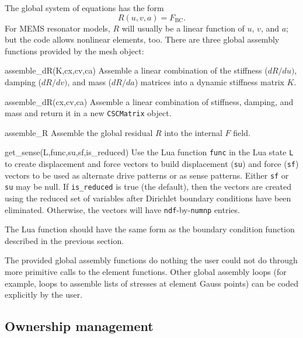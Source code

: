 \documentclass{article}
\newenvironment{codelist}[1][\quad]%
  {\begin{list}{}{%
   \settowidth{\labelwidth}{\texttt{#1}\hfil}%
   \setlength{\leftmargin}{\labelwidth}%
   \addtolength{\leftmargin}{\labelsep}%
   \addtolength{\leftmargin}{\parindent}%
   \renewcommand{\makelabel}[1]{\texttt{##1}}}}%
  {\end{list}}
\newcommand{\ttt}[1]{\texttt{#1}}
\begin{document}
The global system of equations has the form
\begin{equation}
  R(u,v,a) = F_{\mathrm{BC}}.
\end{equation}
For MEMS resonator models, $R$ will usually be a linear function of
$u$, $v$, and $a$; but the code allows nonlinear elements, too.
There are three global assembly functions provided by the mesh object:
\begin{codelist}

  \item[assemble\_dR(K,cx,cv,ca)] 
    Assemble a linear combination of the stiffness ($dR/du)$, damping
    ($dR/dv)$, and mass ($dR/da$) matrices into a dynamic stiffness
    matrix $K$.

  \item[assemble\_dR(cx,cv,ca)]
    Assemble a linear combination of stiffness, damping, and mass and
    return it in a new \ttt{CSCMatrix} object.

  \item[assemble\_R]
    Assemble the global residual $R$ into the internal $F$ field.


  \item[get\_sense(L,func,su,sf,is\_reduced)]
    Use the Lua function \ttt{func} in the Lua state \ttt{L} to create
    displacement and force vectors to build displacement (\ttt{su})
    and force (\ttt{sf}) vectors to be used as alternate drive
    patterns or as sense patterns.  Either \ttt{sf} or \ttt{su} may be
    null.  If \ttt{is\_reduced} is true (the default), then the vectors
    are created using the reduced set of variables after Dirichlet boundary
    conditions have been eliminated.  Otherwise, the vectors will have
    \ttt{ndf}-by-\ttt{numnp} entries.

    The Lua function should have the same form as the boundary condition
    function described in the previous section.

\end{codelist}

The provided global assembly functions do nothing the user could not
do through more primitive calls to the element functions.  Other
global assembly loops (for example, loops to assemble lists of
stresses at element Gauss points) can be coded explicitly by the user.


\subsection{Ownership management}
\end{document}
